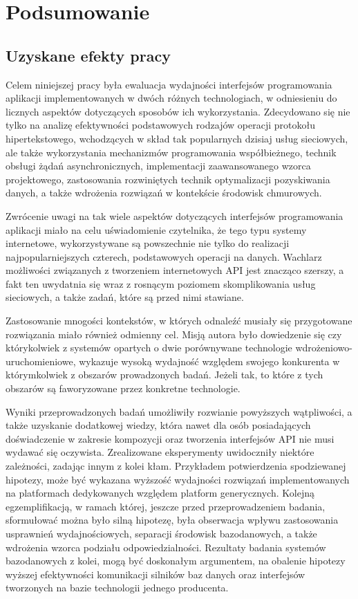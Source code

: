 \chapter{Podsumowanie}
\section{Uzyskane efekty pracy}
Celem niniejszej pracy była ewaluacja wydajności interfejsów programowania aplikacji implementowanych w dwóch różnych technologiach, w odniesieniu do licznych aspektów dotyczących sposobów ich wykorzystania. Zdecydowano się nie tylko na analizę efektywności podstawowych rodzajów operacji protokołu hipertekstowego, wchodzących w skład tak popularnych dzisiaj usług sieciowych, ale także wykorzystania mechanizmów programowania współbieżnego, technik obsługi żądań asynchronicznych, implementacji zaawansowanego wzorca projektowego, zastosowania rozwiniętych technik optymalizacji pozyskiwania danych, a także wdrożenia rozwiązań w kontekście środowisk chmurowych.

Zwrócenie uwagi na tak wiele aspektów dotyczących interfejsów programowania aplikacji miało na celu uświadomienie czytelnika, że tego typu systemy internetowe, wykorzystywane są powszechnie nie tylko do realizacji najpopularniejszych czterech, podstawowych operacji na danych. Wachlarz możliwości związanych z tworzeniem internetowych API jest znacząco szerszy, a fakt ten uwydatnia się wraz z rosnącym poziomem skomplikowania usług sieciowych, a także zadań, które są przed nimi stawiane.

Zastosowanie mnogości kontekstów, w których odnaleźć musiały się przygotowane rozwiązania miało również odmienny cel. Misją autora było dowiedzenie się czy którykolwiek z systemów opartych o dwie porównywane technologie wdrożeniowo-uruchomieniowe, wykazuje wysoką wydajność względem swojego konkurenta w którymkolwiek z obszarów prowadzonych badań. Jeżeli tak, to które z tych obszarów są faworyzowane przez konkretne technologie.

Wyniki przeprowadzonych badań umożliwiły rozwianie powyższych wątpliwości, a także uzyskanie dodatkowej wiedzy, która nawet dla osób posiadających doświadczenie w zakresie kompozycji oraz tworzenia interfejsów API nie musi wydawać się oczywista. Zrealizowane eksperymenty uwidoczniły niektóre zależności, zadając innym z kolei kłam. Przykładem potwierdzenia spodziewanej hipotezy, może być wykazana wyższość wydajności rozwiązań implementowanych na platformach dedykowanych względem platform generycznych. Kolejną egzemplifikacją, w ramach której, jeszcze przed przeprowadzeniem badania, sformułować można było silną hipotezę, była obserwacja wpływu zastosowania usprawnień wydajnościowych, separacji środowisk bazodanowych, a także wdrożenia wzorca podziału odpowiedzialności. Rezultaty badania systemów bazodanowych z kolei, mogą być doskonałym argumentem, na obalenie hipotezy wyższej efektywności komunikacji silników baz danych oraz interfejsów tworzonych na bazie technologii jednego producenta.

